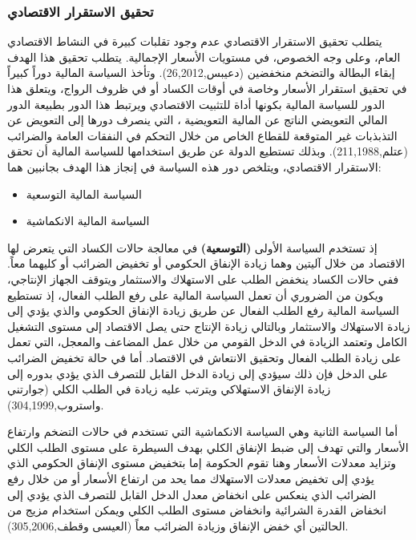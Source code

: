 \documentclass[10pt,a4paper]{report}
\begin{document}
\begin{doublespacing}
\subsubsection{تحقيق الاستقرار الاقتصادي}
\sloppy
يتطلب تحقيق الاستقرار الاقتصادي عدم وجود تقلبات كبيرة في النشاط الاقتصادي العام، وعلى وجه الخصوص، في مستويات الأسعار الإجمالية. يتطلب تحقيق هذا الهدف إبقاء البطالة والتضخم منخفضين {(دعيبس,26,2012)}. وتأخذ السياسة المالية دوراً كبيراً في تحقيق استقرار الأسعار وخاصة في أوقات الكساد أو في ظروف الرواج، ويتعلق هذا الدور للسياسة المالية بكونها أداة للتثبيت الاقتصادي  ويرتبط هذا الدور بطبيعة الدور المالي التعويضي الناتج عن المالية التعويضية ، التي ينصرف دورها إلى التعويض عن التذبذبات غير المتوقعة للقطاع الخاص من خلال التحكم في النفقات العامة والضرائب {(عتلم,211,1988)}. وبذلك تستطيع الدولة عن طريق استخدامها للسياسة المالية أن تحقق الاستقرار الاقتصادي، ويتلخص دور هذه السياسة في إنجاز هذا الهدف بجانبين هما:
\begin{itemize}
	\item السياسة المالية التوسعية
	\item السياسة المالية الانكماشية
\end{itemize}

إذ تستخدم السياسة الأولى \textbf{(التوسعية)} في معالجة حالات الكساد التي يتعرض لها الاقتصاد من خلال آليتين وهما زيادة الإنفاق الحكومي أو تخفيض الضرائب أو كليهما معاً. ففي حالات الكساد ينخفض الطلب على الاستهلاك والاستثمار ويتوقف الجهاز الإنتاجي، ويكون من الضروري أن تعمل السياسة المالية على رفع الطلب الفعال، إذ تستطيع السياسة المالية رفع الطلب الفعال عن طريق زيادة الإنفاق الحكومي والذي يؤدي إلى زيادة الاستهلاك والاستثمار وبالتالي زيادة الإنتاج حتى يصل الاقتصاد إلى مستوى التشغيل الكامل وتعتمد الزيادة في الدخل القومي من خلال عمل المضاعف والمعجل، التي تعمل على زيادة الطلب الفعال وتحقيق الانتعاش في الاقتصاد. أما في حالة تخفيض الضرائب على الدخل فإن ذلك سيؤدي إلى زيادة الدخل القابل للتصرف الذي يؤدي بدوره إلى زيادة الإنفاق الاستهلاكي ويترتب عليه زيادة في الطلب الكلي {(جوارتني واستروب,304,1999)}.

أما السياسة الثانية وهي السياسة الانكماشية التي تستخدم في حالات التضخم وارتفاع الأسعار والتي تهدف إلى ضبط الإنفاق الكلي بهدف السيطرة على مستوى الطلب الكلي وتزايد معدلات الأسعار وهنا تقوم الحكومة إما بتخفيض مستوى الإنفاق الحكومي الذي يؤدي إلى تخفيض معدلات الاستهلاك مما يحد من ارتفاع الأسعار أو من خلال رفع الضرائب الذي ينعكس على انخفاض معدل الدخل القابل للتصرف الذي يؤدي إلى انخفاض القدرة الشرائية وانخفاض مستوى الطلب الكلي ويمكن استخدام مزيج من الحالتين أي خفض الإنفاق وزيادة الضرائب معاً {(العيسى وقطف,305,2006)}.

\end{doublespacing}
\end{document}
